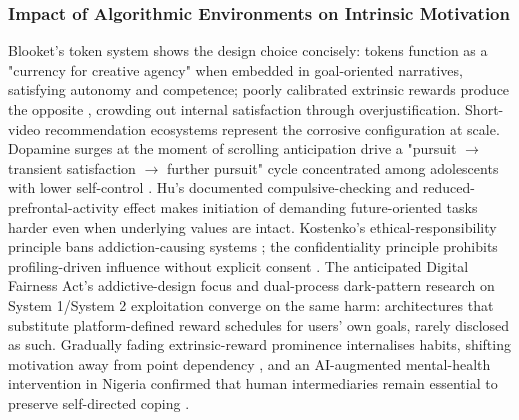 \documentclass[11pt]{article}
\begin{document}
\subsubsection{Impact of Algorithmic Environments on Intrinsic Motivation}
\label{sec:impact_intrinsic_motivation} Blooket's token system shows the design choice concisely: tokens function as a "currency for creative agency" when embedded in goal-oriented narratives, satisfying autonomy and competence; poorly calibrated extrinsic rewards produce the opposite \parencites[7]{9283805}, crowding out internal satisfaction through overjustification. Short-video recommendation ecosystems represent the corrosive configuration at scale. Dopamine surges at the moment of scrolling anticipation drive a "pursuit $\rightarrow$ transient satisfaction $\rightarrow$ further pursuit" cycle concentrated among adolescents with lower self-control \parencites[2]{8958037}[3]{8958037}. Hu's documented compulsive-checking and reduced-prefrontal-activity effect \parencites[2]{3303310} makes initiation of demanding future-oriented tasks harder even when underlying values are intact. Kostenko's ethical-responsibility principle bans addiction-causing systems \parencites[61--62]{2977039}; the confidentiality principle prohibits profiling-driven influence without explicit consent \parencites[44]{2977039}. The anticipated Digital Fairness Act's addictive-design focus \parencites[390]{7896734} and dual-process dark-pattern research on System 1/System 2 exploitation \parencites[6]{6295677} converge on the same harm: architectures that substitute platform-defined reward schedules for users' own goals, rarely disclosed as such. Gradually fading extrinsic-reward prominence internalises habits, shifting motivation away from point dependency \parencites[7]{9283805}, and an AI-augmented mental-health intervention in Nigeria confirmed that human intermediaries remain essential to preserve self-directed coping \parencites[9]{5419804}.
\end{document}
